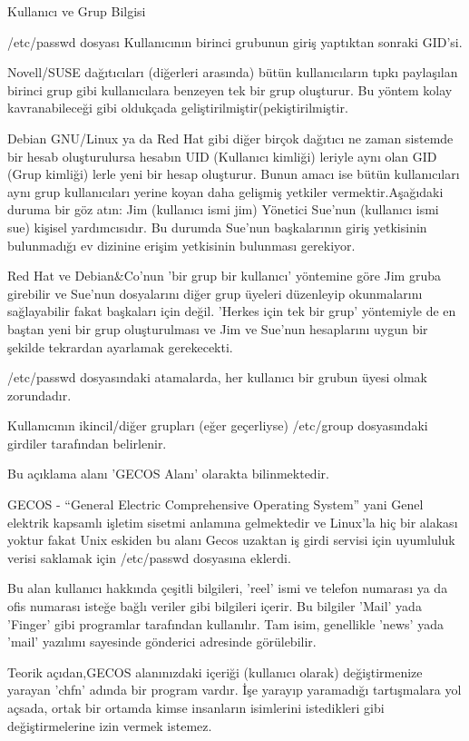 \begin{section}{Kullanıcı ve Grup Bilgisi}
\begin{subsection}{/etc/passwd dosyası}
Kullanıcının birinci grubunun giriş yaptıktan sonraki GID'si.

Novell/SUSE dağıtıcıları (diğerleri arasında) bütün kullanıcıların tıpkı paylaşılan birinci grup gibi kullanıcılara benzeyen tek bir grup oluşturur. Bu yöntem kolay kavranabileceği gibi oldukçada geliştirilmiştir(pekiştirilmiştir.

Debian GNU/Linux ya da Red Hat gibi diğer birçok dağıtıcı ne zaman sistemde bir hesab oluşturulursa hesabın UID (Kullanıcı kimliği) leriyle aynı olan GID (Grup kimliği) lerle yeni bir hesap oluşturur. Bunun amacı ise bütün kullanıcıları aynı grup kullanıcıları yerine koyan daha gelişmiş yetkiler vermektir.Aşağıdaki duruma bir göz atın: Jim (kullanıcı ismi jim) Yönetici Sue'nun (kullanıcı ismi sue) kişisel yardımcısıdır. Bu durumda Sue'nun başkalarının giriş yetkisinin bulunmadığı ev dizinine erişim yetkisinin bulunması gerekiyor.

Red Hat ve Debian\&Co'nun 'bir grup bir kullanıcı' yöntemine göre Jim gruba girebilir ve Sue'nun dosyalarını diğer grup üyeleri düzenleyip okunmalarını sağlayabilir fakat başkaları için değil. 'Herkes için tek bir grup' yöntemiyle
de en baştan yeni bir grup oluşturulması ve Jim ve Sue'nun hesaplarını uygun bir şekilde tekrardan ayarlamak gerekecekti.


/etc/passwd dosyasındaki atamalarda, her kullanıcı bir grubun üyesi olmak zorundadır.

Kullanıcının ikincil/diğer grupları (eğer geçerliyse) /etc/group dosyasındaki girdiler tarafından belirlenir.

Bu açıklama alanı 'GECOS Alanı' olarakta bilinmektedir.

GECOS - “General Electric Comprehensive Operating System” yani Genel elektrik kapsamlı işletim sisetmi anlamına gelmektedir ve Linux'la hiç bir alakası yoktur fakat Unix eskiden bu alanı Gecos uzaktan iş girdi servisi için uyumluluk verisi saklamak için /etc/passwd dosyasına eklerdi.

Bu alan kullanıcı hakkında çeşitli bilgileri, 'reel' ismi ve telefon numarası ya da ofis numarası isteğe bağlı veriler gibi bilgileri içerir. Bu bilgiler 'Mail' yada 'Finger' gibi programlar tarafından kullanılır. Tam isim, genellikle 'news' yada 'mail' yazılımı sayesinde gönderici adresinde görülebilir.

Teorik açıdan,GECOS alanınızdaki içeriği (kullanıcı olarak) değiştirmenize yarayan 'chfn' adında bir program vardır. İşe yarayıp yaramadığı tartışmalara yol açsada, ortak bir ortamda kimse insanların isimlerini istedikleri gibi değiştirmelerine izin vermek istemez.


\end{subsection}
\end{section}
